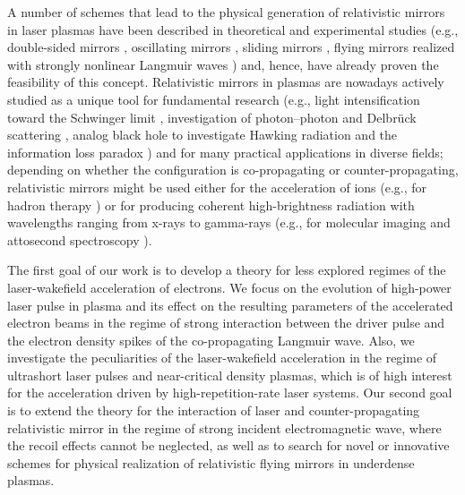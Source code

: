 \documentclass[10pt, a4paper, twoside, openright]{report}
\begin{document}
A number of schemes that lead to the physical generation of relativistic mirrors in laser plasmas have been described in theoretical and experimental studies (e.g., double-sided mirrors \cite{Kulagin2007a, Esirkepov2009, Wu2010, Kiefer2013, Ma2014}, oscillating mirrors \cite{Bulanov1994, Lichters1996, Naumova2004, Wheeler2012, Vincenti2019}, sliding mirrors \cite{Pirozhkov2006}, flying mirrors realized with strongly nonlinear Langmuir waves \cite{Bulanov2003, Kando2007, Pirozhkov2007, Kando2009}) and, hence, have already proven the feasibility of this concept. Relativistic mirrors in plasmas are nowadays actively studied as a unique tool for fundamental research (e.g., light intensification toward the Schwinger limit \cite{Bulanov2003}, investigation of photon–photon and Delbrück scattering \cite{Koga2012, Koga2018}, analog black hole to investigate Hawking radiation and the information loss paradox \cite{Chen2017, Chen2020}) and for many practical applications in diverse fields; depending on whether the configuration is co-propagating or counter-propagating, relativistic mirrors might be used either for the acceleration of ions (e.g., for hadron therapy \cite{Bulanov2002}) or for producing coherent high-brightness radiation with wavelengths ranging from x-rays to gamma-rays (e.g., for molecular imaging \cite{Neutze2000} and attosecond spectroscopy \cite{Krausz2009}).

The first goal of our work is to develop a theory for less explored regimes of the laser-wakefield acceleration of electrons. We focus on the evolution of high-power laser pulse in plasma and its effect on the resulting parameters of the accelerated electron beams in the regime of strong interaction between the driver pulse and the electron density spikes of the co-propagating Langmuir wave. Also, we investigate the peculiarities of the laser-wakefield acceleration in the regime of ultrashort laser pulses and near-critical density plasmas, which is of high interest for the acceleration driven by high-repetition-rate laser systems. Our second goal is to extend the theory for the interaction of laser and counter-propagating relativistic mirror in the regime of strong incident electromagnetic wave, where the recoil effects cannot be neglected, as well as to search for novel or innovative schemes for physical realization of relativistic flying mirrors in underdense plasmas.
\end{document}
